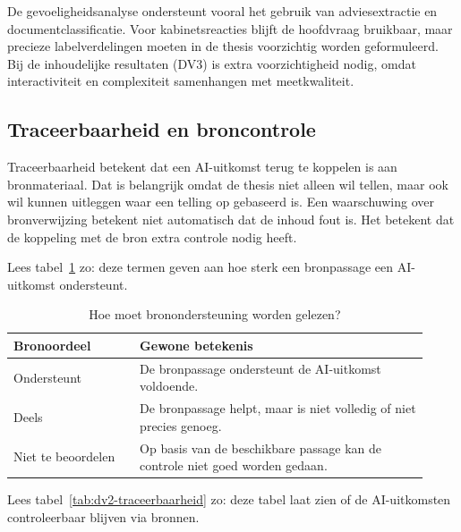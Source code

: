 De gevoeligheidsanalyse ondersteunt vooral het gebruik van adviesextractie en documentclassificatie. Voor kabinetsreacties blijft de hoofdvraag bruikbaar, maar precieze labelverdelingen moeten in de thesis voorzichtig worden geformuleerd. Bij de inhoudelijke resultaten (DV3) is extra voorzichtigheid nodig, omdat interactiviteit en complexiteit samenhangen met meetkwaliteit.

\subsection{Traceerbaarheid en broncontrole}
\label{subsec:dv2-traceerbaarheid}

Traceerbaarheid betekent dat een AI-uitkomst terug te koppelen is aan bronmateriaal. Dat is belangrijk omdat de thesis niet alleen wil tellen, maar ook wil kunnen uitleggen waar een telling op gebaseerd is. Een waarschuwing over bronverwijzing betekent niet automatisch dat de inhoud fout is. Het betekent dat de koppeling met de bron extra controle nodig heeft.

Lees tabel~\ref{tab:dv2-traceerbaarheid-begrippen} zo: deze termen geven aan hoe sterk een bronpassage een AI-uitkomst ondersteunt.

\begin{table}[htbp]
\centering
\small
\caption{Hoe moet bronondersteuning worden gelezen?}
\label{tab:dv2-traceerbaarheid-begrippen}
\begin{tabular}{p{0.28\linewidth}p{0.64\linewidth}}
\hline
Bronoordeel & Gewone betekenis \\
\hline
Ondersteunt & De bronpassage ondersteunt de AI-uitkomst voldoende. \\
Deels & De bronpassage helpt, maar is niet volledig of niet precies genoeg. \\
Niet te beoordelen & Op basis van de beschikbare passage kan de controle niet goed worden gedaan. \\
\hline
\end{tabular}
\end{table}

Lees tabel~\ref{tab:dv2-traceerbaarheid} zo: deze tabel laat zien of de AI-uitkomsten controleerbaar blijven via bronnen.

